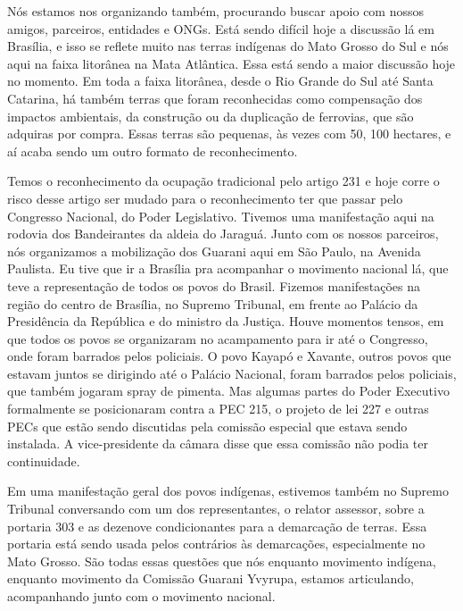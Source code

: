 \documentclass{article}
\begin{document}
N\'os estamos nos organizando tamb\'em, procurando buscar apoio com
nossos amigos, parceiros, entidades e ONGs. Est\'a sendo dif\'icil hoje
a discuss\~ao l\'a em Bras\'ilia, e isso se reflete muito nas terras
ind\'igenas do Mato Grosso do Sul e n\'os aqui na faixa litor\^anea na
Mata Atl\^antica. Essa est\'a sendo a maior discuss\~ao hoje no
momento. Em toda a faixa litor\^anea, desde o Rio Grande do Sul at\'e
Santa Catarina, h\'a tamb\'em terras que foram reconhecidas como
compensa\c{c}\~ao dos impactos ambientais, da constru\c{c}\~ao ou da
duplica\c{c}\~ao de ferrovias, que s\~ao adquiras por compra. Essas
terras s\~ao pequenas, \`as vezes com 50, 100 hectares, e a\'i acaba
sendo um outro formato de reconhecimento.

Temos o reconhecimento da ocupa\c{c}\~ao tradicional pelo artigo 231 e
hoje corre o risco desse artigo ser mudado para o reconhecimento ter
que passar pelo Congresso Nacional, do Poder Legislativo. Tivemos uma
manifesta\c{c}\~ao aqui na rodovia dos Bandeirantes da aldeia do
Jaragu\'a. Junto com os nossos parceiros, n\'os organizamos a
mobiliza\c{c}\~ao dos Guarani aqui em S\~ao Paulo, na Avenida Paulista.
Eu tive que ir a Bras\'ilia pra acompanhar o movimento nacional l\'a,
que teve a representa\c{c}\~ao de todos os povos do Brasil. Fizemos
manifesta\c{c}\~oes na regi\~ao do centro de Bras\'ilia, no Supremo
Tribunal, em frente ao Pal\'acio da Presid\^encia da Rep\'ublica e do
ministro da Justi\c{c}a. Houve momentos tensos, em que todos os povos
se organizaram no acampamento para ir at\'e o Congresso, onde foram
barrados pelos policiais. O povo Kayap\'o e Xavante, outros povos que
estavam juntos se dirigindo at\'e o Pal\'acio Nacional, foram barrados
pelos policiais, que tamb\'em jogaram spray de pimenta. Mas algumas
partes do Poder Executivo formalmente se posicionaram contra a PEC 215,
o projeto de lei 227 e outras PECs que est\~ao sendo discutidas pela
comiss\~ao especial que estava sendo instalada. A vice-presidente da
c\^amara disse que essa comiss\~ao n\~ao podia ter continuidade.

Em uma manifesta\c{c}\~ao geral dos povos ind\'igenas, estivemos
tamb\'em no Supremo Tribunal conversando com um dos representantes, o
relator assessor, sobre a portaria 303 e as dezenove condicionantes
para a demarca\c{c}\~ao de terras. Essa portaria est\'a sendo usada
pelos contr\'arios \`as demarca\c{c}\~oes, especialmente no Mato
Grosso. S\~ao todas essas quest\~oes que n\'os enquanto movimento
ind\'igena, enquanto movimento da Comiss\~ao Guarani Yvyrupa, estamos
articulando, acompanhando junto com o movimento nacional.
\end{document}
